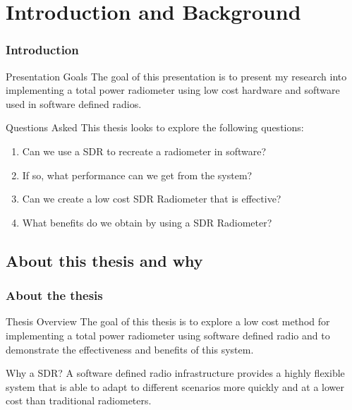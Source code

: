 \documentclass[notes]{beamer}
\begin{document}
\section{Introduction and Background}
\begin{frame}
\frametitle{Introduction}
\begin{block}{Presentation Goals}
The goal of this presentation is to present my research into implementing a total power radiometer using low cost hardware and software used in software defined radios.
\end{block}
\pause

\begin{block}{Questions Asked}
This thesis looks to explore the following questions: 
\begin{enumerate}
\item Can we use a SDR to recreate a radiometer in software?
\item If so, what performance can we get from the system?
\item Can we create a low cost SDR Radiometer that is effective?
\item What benefits do we obtain by using a SDR Radiometer?
\end{enumerate}
\end{block}
\end{frame}  
\subsection{About this thesis and why}
\begin{frame}
\frametitle{About the thesis}
\begin{block}{Thesis Overview}
The goal of this thesis is to explore a low cost method for implementing a total power radiometer using software defined radio and to demonstrate the effectiveness and benefits of this system.
\end{block}
\pause

\begin{block}{Why a SDR?}
A software defined radio infrastructure provides a highly flexible system that is able to adapt to different scenarios more quickly and at a lower cost than traditional radiometers.
\end{block}
\end{frame} 
\end{document}
